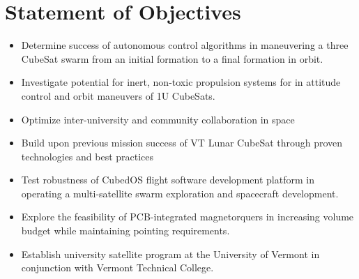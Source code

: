 \section{Statement of Objectives}

\begin{itemize}
  \item Determine success of autonomous control algorithms in
    maneuvering a three CubeSat swarm from an initial formation to a
    final formation in orbit.
  \item Investigate potential for inert, non-toxic propulsion systems
    for in attitude control and orbit maneuvers of 1U CubeSats.
  \item Optimize inter-university and community collaboration in space
  \item Build upon previous mission success of VT Lunar CubeSat through proven technologies and best practices
  \item Test robustness of CubedOS flight software development platform in operating a multi-satellite swarm
    exploration and spacecraft development.
  \item Explore the feasibility of PCB-integrated magnetorquers in
    increasing volume budget while maintaining pointing requirements.
  \item Establish university satellite program at the University of
    Vermont in conjunction with Vermont Technical College.
\end{itemize}
